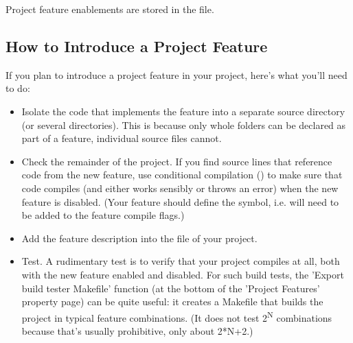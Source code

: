 Project feature enablements are stored in the  file.


\subsection{How to Introduce a Project Feature}
\label{sec:build-sim-progs:introducing-project-features}

If you plan to introduce a project feature in your project, here's what you'll need
to do:

\begin{itemize}
  \item Isolate the code that implements the feature into a separate source directory
        (or several directories). This is because only whole folders can be
        declared as part of a feature, individual source files cannot.

  \item Check the remainder of the project. If you find source lines that reference
        code from the new feature, use conditional compilation ()
        to make sure that code compiles (and either works sensibly or throws an error)
        when the new feature is disabled. (Your feature should define the 
        symbol, i.e.  will need to be added to the feature compile flags.)

  \item Add the feature description into the  file of your project.

  \item Test. A rudimentary test is to verify that your project compiles at all, both
        with the new feature enabled and disabled. For such build tests, the
        'Export build tester Makefile' function (at the bottom of the 'Project Features'
        property page) can be quite useful: it creates a Makefile that builds the
        project in typical feature combinations. (It does not test 2\textsuperscript{N} combinations because
        that's usually prohibitive, only about 2*N+2.)
\end{itemize}

